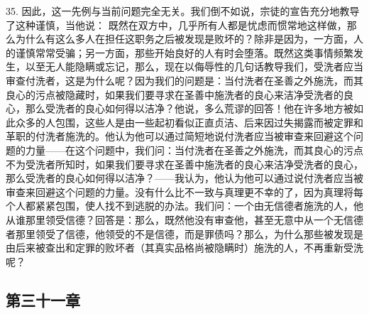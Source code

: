 35. 因此，这一先例与当前问题完全无关。我们倒不如说，宗徒的宣告充分地教导了这种谨慎，当他说： 既然在双方中，几乎所有人都是忧虑而惯常地这样做，那么为什么有这么多人在担任这职务之后被发现是败坏的？除非是因为，一方面，人的谨慎常常受骗；另一方面，那些开始良好的人有时会堕落。既然这类事情频繁发生，以至无人能隐瞒或忘记，那么，现在以侮辱性的几句话教导我们，受洗者应当审查付洗者，这是为什么呢？因为我们的问题是：当付洗者在圣善之外施洗，而其良心的污点被隐藏时，如果我们要寻求在圣善中施洗者的良心来洁净受洗者的良心，那么受洗者的良心如何得以洁净？他说，多么荒谬的回答！他在许多地方被如此众多的人包围，这些人是由一些起初看似正直贞洁、后来因过失揭露而被定罪和革职的付洗者施洗的。他认为他可以通过简短地说付洗者应当被审查来回避这个问题的力量——在这个问题中，我们问：当付洗者在圣善之外施洗，而其良心的污点不为受洗者所知时，如果我们要寻求在圣善中施洗者的良心来洁净受洗者的良心，那么受洗者的良心如何得以洁净？——我认为，他认为他可以通过说付洗者应当被审查来回避这个问题的力量。没有什么比不一致与真理更不幸的了，因为真理将每个人都紧紧包围，使人找不到逃脱的办法。我们问：一个由无信德者施洗的人，他从谁那里领受信德？回答是：那么，既然他没有审查他，甚至无意中从一个无信德者那里领受了信德，他领受的不是信德，而是罪债吗？那么，为什么那些被发现是由后来被查出和定罪的败坏者（其真实品格尚被隐瞒时）施洗的人，不再重新受洗呢？\par


\subsection{第三十一章}

